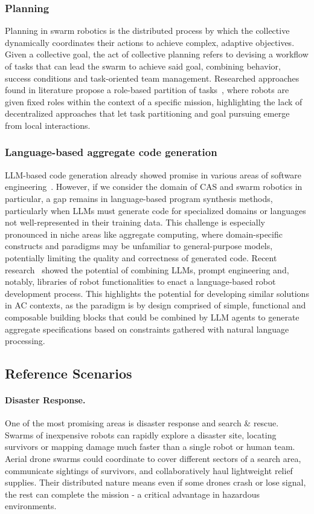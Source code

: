 \documentclass[12pt]{article}
\begin{document}
\subsubsection{Planning}
Planning in swarm robotics is the distributed process by which the collective dynamically coordinates their actions to achieve complex, adaptive objectives.
Given a collective goal, the act of collective planning refers to devising a workflow of tasks that can lead the swarm to achieve said goal, combining behavior, success conditions and task-oriented team management.
Researched approaches found in literature propose a role-based partition of tasks~\cite{sampedro2016flexible}, where robots are given fixed roles within the context of a specific mission, highlighting the lack
of decentralized approaches that let task partitioning and goal pursuing emerge from local interactions.

\subsubsection{Language-based aggregate code generation}
LLM-based code generation already showed promise in various areas of software engineering~\cite{hudson2024software,zhou2025large,he2025llm}. However, if we consider the domain of CAS and swarm robotics in particular, 
a gap remains in language-based program synthesis methods, particularly when LLMs must generate code for specialized domains or languages not well-represented in their training data. This challenge is especially pronounced in niche areas like aggregate computing, where domain-specific constructs and paradigms may be unfamiliar to general-purpose models, potentially limiting the quality and correctness of generated code.
Recent research~\cite{vemprala2024chatgpt} showed the potential of combining LLMs, prompt engineering and, notably, libraries of robot functionalities 
to enact a language-based robot development process. This highlights the potential for developing similar solutions in AC contexts, as the paradigm is by design comprised of simple, functional and composable building blocks that could
be combined by LLM agents to generate aggregate specifications based on constraints gathered with natural language processing.

\subsection{Reference Scenarios}
\label{sec:scenarios}

\paragraph{Disaster Response.} One of the most promising areas is disaster response and search \& rescue. Swarms of inexpensive robots can rapidly explore a disaster site, 
locating survivors or mapping damage much faster than a single robot or human team. 
Aerial drone swarms could coordinate to cover different sectors of a search area, communicate sightings of survivors, and collaboratively haul lightweight relief supplies. 
Their distributed nature means even if some drones crash or lose signal, the rest can complete the mission - a critical advantage in hazardous environments.
\end{document}

